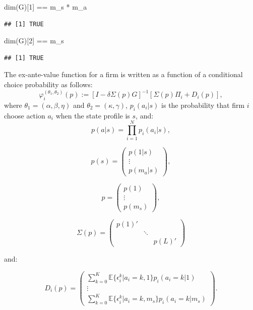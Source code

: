 \documentclass[
]{book}
\newenvironment{Shaded}{\begin{snugshade}}{\end{snugshade}}
\newcommand{\DecValTok}[1]{\textcolor[rgb]{0.00,0.00,0.81}{#1}}
\newcommand{\FunctionTok}[1]{\textcolor[rgb]{0.00,0.00,0.00}{#1}}
\newcommand{\NormalTok}[1]{#1}
\newcommand{\SpecialCharTok}[1]{\textcolor[rgb]{0.00,0.00,0.00}{#1}}
\begin{document}
\begin{Shaded}
\begin{Highlighting}[]
\FunctionTok{dim}\NormalTok{(G)[}\DecValTok{1}\NormalTok{] }\SpecialCharTok{==}\NormalTok{ m\_s }\SpecialCharTok{*}\NormalTok{ m\_a}
\end{Highlighting}
\end{Shaded}

\begin{verbatim}
## [1] TRUE
\end{verbatim}

\begin{Shaded}
\begin{Highlighting}[]
\FunctionTok{dim}\NormalTok{(G)[}\DecValTok{2}\NormalTok{] }\SpecialCharTok{==}\NormalTok{ m\_s}
\end{Highlighting}
\end{Shaded}

\begin{verbatim}
## [1] TRUE
\end{verbatim}

The ex-ante-value function for a firm is written as a function of a conditional choice probability as follows:
\[
\varphi_i^{(\theta_1, \theta_2)}(p) := [I - \delta \Sigma(p) G]^{-1}[\Sigma(p)\Pi_i + D_i(p)],
\]
where \(\theta_1 = (\alpha, \beta, \eta)\) and \(\theta_2 = (\kappa, \gamma)\), \(p_i(a_i|s)\) is the probability that firm \(i\) choose action \(a_i\) when the state profile is \(s\), and:
\[
p(a|s) = \prod_{i = 1}^N p_i(a_i|s), 
\]

\[
p(s) = 
\begin{pmatrix}
p(1|s) \\
\vdots \\
p(m_a|s)
\end{pmatrix},
\]

\[
p = 
\begin{pmatrix}
p(1)\\
\vdots\\
p(m_s)
\end{pmatrix},
\]

\[
\Sigma(p) =
\begin{pmatrix}
p(1)' & & \\
 & \ddots & \\
 & & p(L)'
\end{pmatrix}
\]

and:

\[
D_i(p) =
\begin{pmatrix}
\sum_{k = 0}^K \mathbb{E}\{\epsilon_i^k|a_i = k, 1\}p_i(a_i = k|1)\\
\vdots\\
\sum_{k = 0}^K \mathbb{E}\{\epsilon_i^k|a_i = k, m_s\}p_i(a_i = k|m_s)
\end{pmatrix}.
\]
\end{document}
